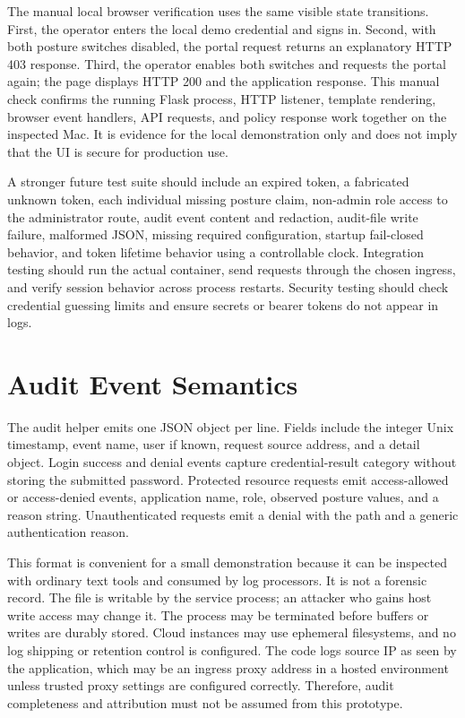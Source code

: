 The manual local browser verification uses the same visible state transitions. First, the operator enters the local demo credential and signs in. Second, with both posture switches disabled, the portal request returns an explanatory HTTP 403 response. Third, the operator enables both switches and requests the portal again; the page displays HTTP 200 and the application response. This manual check confirms the running Flask process, HTTP listener, template rendering, browser event handlers, API requests, and policy response work together on the inspected Mac. It is evidence for the local demonstration only and does not imply that the UI is secure for production use.

A stronger future test suite should include an expired token, a fabricated unknown token, each individual missing posture claim, non-admin role access to the administrator route, audit event content and redaction, audit-file write failure, malformed JSON, missing required configuration, startup fail-closed behavior, and token lifetime behavior using a controllable clock. Integration testing should run the actual container, send requests through the chosen ingress, and verify session behavior across process restarts. Security testing should check credential guessing limits and ensure secrets or bearer tokens do not appear in logs.

\section{Audit Event Semantics}
The audit helper emits one JSON object per line. Fields include the integer Unix timestamp, event name, user if known, request source address, and a detail object. Login success and denial events capture credential-result category without storing the submitted password. Protected resource requests emit access-allowed or access-denied events, application name, role, observed posture values, and a reason string. Unauthenticated requests emit a denial with the path and a generic authentication reason.

This format is convenient for a small demonstration because it can be inspected with ordinary text tools and consumed by log processors. It is not a forensic record. The file is writable by the service process; an attacker who gains host write access may change it. The process may be terminated before buffers or writes are durably stored. Cloud instances may use ephemeral filesystems, and no log shipping or retention control is configured. The code logs source IP as seen by the application, which may be an ingress proxy address in a hosted environment unless trusted proxy settings are configured correctly. Therefore, audit completeness and attribution must not be assumed from this prototype.


